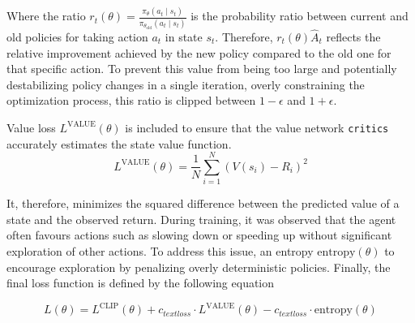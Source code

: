 \documentclass{article}
\begin{document}
Where the ratio $r_t(\theta) = \frac{\pi_\theta(a_t \mid s_t)}{\pi_{\theta_\text{old}}(a_t \mid s_t)}$ is the probability ratio between current and old policies for taking action $a_t$ in state $s_t$. Therefore, $r_t(\theta) \hat{A}_t$ reflects the relative improvement achieved by the new policy compared to the old one for that specific action. To prevent this value from being too large and potentially destabilizing policy changes in a single iteration, overly constraining the optimization process, this ratio is clipped between $1 - \epsilon$ and $1 + \epsilon$.

Value loss $L^{\text{VALUE}}(\theta)$ is included to ensure that the value network \texttt{critics} accurately estimates the state value function. %
\vspace*{-14pt}
\begin{equation}
    L^{\text{VALUE}}(\theta) = \frac{1}{N} \sum_{i=1}^{N} \left( V(s_i) - R_i \right)^2
\end{equation}
\vspace*{-8pt}

It, therefore, minimizes the squared difference between the predicted value of a state and the observed return. 
During training, it was observed that the agent often favours actions such as slowing down or speeding up without significant exploration of other actions. 
To address this issue, an entropy $\text{entropy}(\theta)$ to encourage exploration by penalizing overly deterministic policies. Finally, the final loss function is defined by the following equation

\vspace*{-8pt}
\begin{equation}
    L(\theta) = L^{\text{CLIP}}(\theta) + c_{text{loss}} \cdot L^{\text{VALUE}}(\theta) - c_{text{loss}} \cdot \text{entropy}(\theta)
\end{equation}
\vspace*{-12pt}
\end{document}
